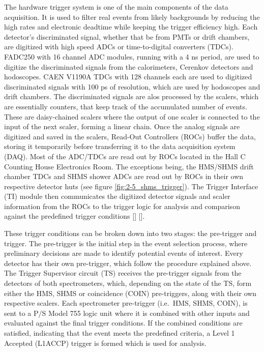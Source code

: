 \documentclass[
]{report}
\begin{document}
The hardware trigger system is one of the main components of the data
acquisition. It is used to filter real events from likely backgrounds by
reducing the high rates and electronic deadtime while keeping the
trigger efficiency high. Each detector's discriminated signal, whether
that be from PMTs or drift chambers, are digitized with high speed ADCs
or time-to-digital converters (TDCs). FADC250 with 16 channel ADC
modules, running with a 4 ns period, are used to digitize the
discriminated signals from the calorimeters, Cerenkov detectors and
hodoscopes. CAEN V1190A TDCs with 128 channels each are used to
digitized discriminated signals with 100 ps of resolution, which are
used by hodoscopes and drift chambers. The discriminated signals are
alos processed by the scalers, which are essentially counters, that keep
track of the accumulated number of events. These are daisy-chained
scalers where the output of one scaler is connected to the input of the
next scaler, forming a linear chain. Once the analog signals are
digitized and saved in the scalers, Read-Out Controllers (ROCs) buffer
the data, storing it temporarily before transferring it to the data
acquisition system (DAQ). Most of the ADC/TDCs are read out by ROCs
located in the Hall C Counting House Electronics Room. The exceptions
being, the HMS/SHMS drift chamber TDCs and SHMS shower ADCs are read out
by ROCs in their own respective detector huts (see figure
\ref{fig:2-5_shms_trigger}). The Trigger Interface (TI) module then
communicates the digitized detector signals and scaler information from
the ROCs to the trigger logic for analysis and comparison against the
predefined trigger conditions {[}\cite{pooser_private_2018}{]}
{[}\cite{yero_hall_2019}{]}.



These trigger conditions can be broken down into two stages: the
pre-trigger and trigger. The pre-trigger is the initial step in the
event selection process, where preliminary decisions are made to
identify potential events of interest. Every detector has their own
pre-trigger, which follow the procedure explained above. The Trigger
Supervisor circuit (TS) receives the pre-trigger signals from the
detectors of both spectrometers, which, depending on the state of the
TS, form either the HMS, SHMS or coincidence (COIN) pre-triggers, along
with their own respective scalers. Each spectrometer pre-trigger
(i.e.~HMS, SHMS, COIN), is sent to a P/S Model 755 logic unit where it
is combined with other inputs and evaluated against the final trigger
conditions. If the combined conditions are satisfied, indicating that
the event meets the predefined criteria, a Level 1 Accepted (L1ACCP)
trigger is formed which is used for analysis.
\end{document}
